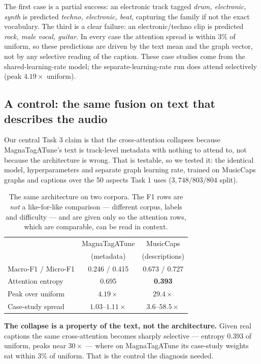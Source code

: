 \documentclass[conference]{IEEEtran}
\begin{document}
\noindent The first case is a partial success: an electronic track tagged
\emph{drum, electronic, synth} is predicted \emph{techno, electronic, beat},
capturing the family if not the exact vocabulary. The third is a clear failure:
an electronic/techno clip is predicted \emph{rock, male vocal, guitar}. In every
case the attention spread is within $3\%$ of uniform, so these predictions are
driven by the text mean and the graph vector, not by any selective reading of
the caption. These case studies come from the shared-learning-rate model; the
separate-learning-rate run does attend selectively (peak $4.19\times$ uniform).

\subsection{A control: the same fusion on text that describes the audio}

Our central Task 3 claim is that the cross-attention collapses because
MagnaTagATune's text is track-level metadata with nothing to attend to, not
because the architecture is wrong. That is testable, so we tested it: the
identical model, hyperparameters and separate graph learning rate, trained on
MusicCaps graphs and captions over the 50 aspects Task 1 uses
($3{,}748/803/804$ split).

\begin{table}[H]
\centering\small
\caption{The same architecture on two corpora. The F1 rows are \emph{not} a
like-for-like comparison --- different corpus, labels and difficulty --- and are
given only so the attention rows, which are comparable, can be read in context.}
\label{tab:textcontrol}
\begin{tabular}{lcc}
\toprule
& MagnaTagATune & MusicCaps \\
& (metadata) & (descriptions) \\
\midrule
Macro-F1 / Micro-F1 & 0.246 / 0.415 & 0.673 / 0.727 \\
Attention entropy & 0.695 & \textbf{0.393} \\
Peak over uniform & $4.19\times$ & $\mathbf{29.4\times}$ \\
Case-study spread & $1.03$--$1.11\times$ & $3.6$--$58.5\times$ \\
\bottomrule
\end{tabular}
\end{table}

\noindent \textbf{The collapse is a property of the text, not the
architecture.} Given real captions the same cross-attention becomes sharply
selective --- entropy $0.393$ of uniform, peaks near $30\times$ --- where on
MagnaTagATune its case-study weights sat within $3\%$ of uniform. That is the
control the diagnosis needed.
\end{document}
